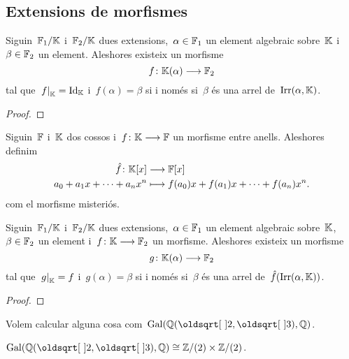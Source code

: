 \documentclass[../Apunts.tex]{subfiles}
\begin{document}
\subsection{Extensions de morfismes}
	\begin{lemma}
		\label{lema:primer lema de l'extensió de morfismes}
		Siguin~\(\mathbb{F}_{1}/\mathbb{K}\) i~\(\mathbb{F}_{2}/\mathbb{K}\) dues extensions,~\(\alpha\in\mathbb{F}_{1}\) un element algebraic sobre~\(\mathbb{K}\) i~\(\beta\in\mathbb{F}_{2}\) un element. Aleshores existeix un morfisme
		\[f\colon\mathbb{K}(\alpha)\longrightarrow\mathbb{F}_{2}\]
		tal que~\(\left.f\right|_{\KK}=\Id_{\KK}\) i~\(f(\alpha)=\beta\)
		si i només si~\(\beta\) és una arrel de~\(\operatorname{Irr}(\alpha,\mathbb{K})\).
		\begin{proof}
		\end{proof}
	\end{lemma}
	\begin{definition}
		\label{def:morifsme misteriós}
		Siguin~\(\mathbb{F}\) i~\(\mathbb{K}\) dos cossos i~\(f\colon\mathbb{K}\longrightarrow\mathbb{F}\) un morfisme entre anells. Aleshores definim
		\begin{align*}
			\hat{f}\colon\mathbb{K}[x]&\longrightarrow\mathbb{F}[x] \\
			a_{0}+a_{1}x+\dots+a_{n}x^{n}&\longmapsto f(a_{0})x+f(a_{1})x+\dots+f(a_{n})x^{n}.
		\end{align*}
		com el morfisme misteriós.
	\end{definition}
	\begin{lemma}
		\label{lema:extensió de morfismes}
		Siguin~\(\mathbb{F}_{1}/\mathbb{K}\) i~\(\mathbb{F}_{2}/\mathbb{K}\) dues extensions,~\(\alpha\in\mathbb{F}_{1}\) un element algebraic sobre~\(\mathbb{K}\),~\(\beta\in\mathbb{F}_{2}\) un element i~\(f\colon\mathbb{K}\longrightarrow\mathbb{F}_{2}\) un morfisme. Aleshores existeix un morfisme
		\[g\colon\mathbb{K}(\alpha)\longrightarrow\mathbb{F}_{2}\]
		tal que~\(\left.g\right|_{\KK}=f\) i~\(g(\alpha)=\beta\)
		si i només si~\(\beta\) és una arrel de~\(\hat{f}(\operatorname{Irr}(\alpha,\mathbb{K}))\).
		\begin{proof}
		\end{proof}
	\end{lemma}
	\begin{example}
		\label{ex:càlcul d'un altre grup de Galois}
		Volem calcular alguna cosa com~\(\Gal(\QQ(\sqrt{2},\sqrt{3}),\QQ)\).
		\begin{solution}
			\(\Gal(\QQ(\sqrt{2},\sqrt{3}),\QQ)\cong\ZZ/(2)\times\ZZ/(2)\).
		\end{solution}
	\end{example}
\end{document}
